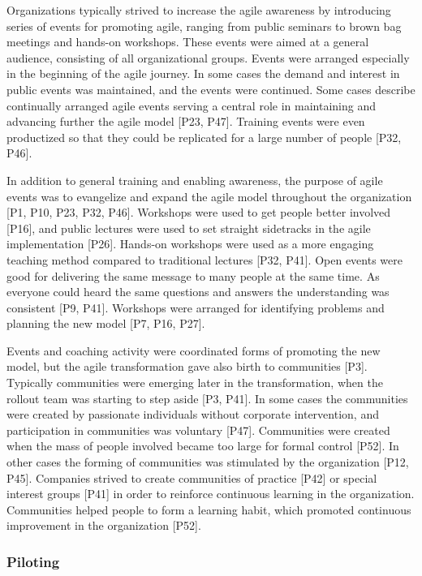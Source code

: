 \documentclass[preprint,authoryear,12pt]{elsarticle}
\begin{document}
Organizations typically strived to increase the agile awareness by introducing
series of events for promoting agile, ranging from public seminars to brown bag
meetings and hands-on workshops. These events were aimed at a general audience,
consisting of all organizational groups. Events were arranged especially in the
beginning of the agile journey. In some cases the demand and interest in public
events was maintained, and the events were continued.
Some cases describe continually arranged agile events serving a central role in
maintaining and advancing further the agile model [P23, P47].
Training events were even productized so that they could be replicated for a
large number of people [P32, P46].

In addition to general training and enabling awareness, the purpose of agile
events was to evangelize and expand the agile model throughout the organization
[P1, P10, P23, P32, P46].
Workshops were used to get people better involved [P16], and public lectures
were used to set straight sidetracks in the agile implementation [P26].
Hands-on workshops were used as a more engaging teaching method compared to
traditional lectures [P32, P41]. Open events were good for delivering the same
message to many people at the same time. As everyone could heard the same
questions and answers the understanding was consistent [P9, P41].
Workshops were arranged for identifying problems and planning the new model [P7,
P16, P27].



Events and coaching activity were coordinated forms of promoting the new model,
but the agile transformation gave also birth to communities [P3]. Typically
communities were emerging later in the transformation, when the rollout team
was starting to step aside [P3, P41].
In some cases the communities were created by passionate individuals without
corporate intervention, and participation in communities was voluntary [P47].
Communities were created when the mass of people involved became too large for
formal control [P52].
In other cases the forming of communities was stimulated by the organization
[P12, P45].
Companies strived to create communities of practice [P42] or special interest
groups [P41] in order to reinforce continuous learning in the organization.
Communities helped people to form a learning habit, which promoted continuous
improvement in the organization [P52].


\subsubsection{Piloting}
\end{document}
